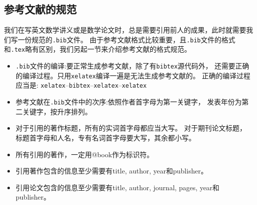 \subsection{参考文献的规范}
我们在写英文数学讲义或是数学论文时，总是需要引用前人的成果，此时就需要我们写一份规范的\texttt{.bib}文件。
由于参考文献格式比较重要，且\texttt{.bib}文件的格式和\texttt{.tex}略有区别，我们另起一节来介绍参考文献的格式规范。
\begin{itemize}
  \item \texttt{.bib}文件的编译:要正常生成参考文献，除了有\texttt{bibtex}源代码外，
  还需要正确的编译过程。只用\texttt{xelatex}编译一遍是无法生成参考文献的。
  正确的编译过程应当是:
  \texttt{xelatex}--\texttt{bibtex}--\texttt{xelatex}--\texttt{xelatex}
  \item 参考文献在\texttt{.bib}文件中的次序:依照作者首字母为第一关键字，
  发表年份为第二关键字，按升序排列。
  \item 对于引用的著作标题，所有的实词首字母都应当大写。
  对于期刊论文标题，标题首字母和人名，专有名词首字母要大写，其余都小写。
  \item 所有引用的著作，一定用@book作为标识符。
  \item 引用著作包含的信息至少需要有title, author, year和publisher。
  \item 引用论文包含的信息至少需要有title, author, journal, pages, year和publisher。
\end{itemize}

